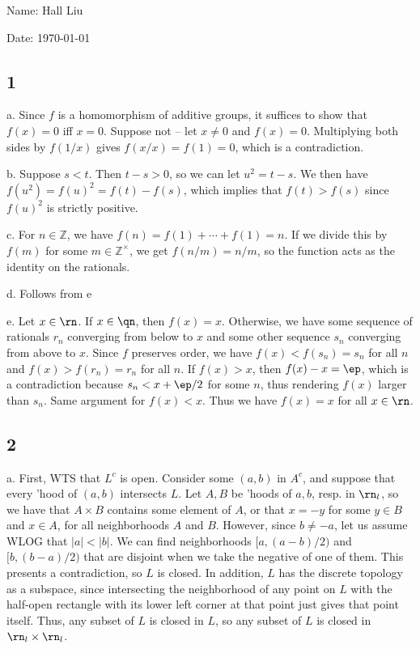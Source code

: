 \documentclass{article}
\begin{document}
Name: Hall Liu

Date: \today 
\vspace{1.5cm}
\subsection*{1}
a. Since $f$ is a homomorphism of additive groups, it suffices to show that $f(x)=0$ iff $x=0$. Suppose not -- let $x\neq0$ and $f(x)=0$. Multiplying both sides by $f(1/x)$ gives $f(x/x)=f(1)=0$, which is a contradiction.

b. Suppose $s<t$. Then $t-s>0$, so we can let $u^2=t-s$. We then have $f(u^2)=f(u)^2=f(t)-f(s)$, which implies that $f(t)>f(s)$ since $f(u)^2$ is strictly positive.

c. For $n\in\mathbb{Z}$, we have $f(n)=f(1)+\cdots+f(1)=n$. If we divide this by $f(m)$ for some $m\in\mathbb{Z}^\times$, we get $f(n/m)=n/m$, so the function acts as the identity on the rationals.

d. Follows from e

e. Let $x\in\rn$. If $x\in\qn$, then $f(x)=x$. Otherwise, we have some sequence of rationals $r_n$ converging from below to $x$ and some other sequence $s_n$ converging from above to $x$. Since $f$ preserves order, we have $f(x)<f(s_n)=s_n$ for all $n$ and $f(x)>f(r_n)=r_n$ for all $n$. If $f(x)>x$, then $f(x)-x=\ep$, which is a contradiction because $s_n<x+\ep/2$ for some $n$, thus rendering $f(x)$ larger than $s_n$. Same argument for $f(x)<x$. Thus we have $f(x)=x$ for all $x\in\rn$.
\subsection*{2}
a. First, WTS that $L^c$ is open. Consider some $(a,b)$ in $A^c$, and suppose that every 'hood of $(a,b)$ intersects $L$. Let $A,B$ be 'hoods of $a,b$, resp. in $\rn_l$, so we have that $A\times B$ contains some element of $A$, or that $x=-y$ for some $y\in B$ and $x\in A$, for all neighborhoods $A$ and $B$. However, since $b\neq -a$, let us assume WLOG that $|a|<|b|$. We can find neighborhoods $[a,(a-b)/2)$ and $[b,(b-a)/2)$ that are disjoint when we take the negative of one of them. This presents a contradiction, so $L$ is closed. In addition, $L$ has the discrete topology as a subspace, since intersecting the neighborhood of any point on $L$ with the half-open rectangle with its lower left corner at that point just gives that point itself. Thus, any subset of $L$ is closed in $L$, so any subset of $L$ is closed in $\rn_l\times\rn_l$.
\end{document}
